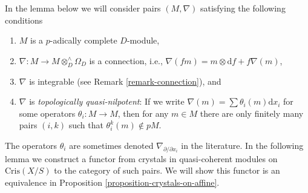 \noindent
In the lemma below we will consider pairs $(M, \nabla)$ satisfying the
following conditions
\begin{enumerate}
\item
\label{item-complete}
$M$ is a $p$-adically complete $D$-module,
\item
\label{item-connection}
$\nabla : M \to M \otimes^\wedge_D \Omega_D$ is a connection, i.e.,
$\nabla(fm) = m \otimes \text{d}f + f\nabla(m)$,
\item
\label{item-integrable}
$\nabla$ is integrable
(see Remark \ref{remark-connection}), and
\item
\label{item-topologically-quasi-nilpotent}
$\nabla$ is {\it topologically quasi-nilpotent}: If we write
$\nabla(m) = \sum \theta_i(m)\text{d}x_i$ for some operators
$\theta_i : M \to M$, then for any $m \in M$ there are only finitely
many pairs $(i, k)$ such that $\theta_i^k(m) \not \in pM$.
\end{enumerate}
The operators $\theta_i$ are sometimes denoted
$\nabla_{\partial/\partial x_i}$ in the literature.
In the following lemma we construct a functor from crystals in quasi-coherent
modules on $\text{Cris}(X/S)$ to the category of such pairs. We will show
this functor is an equivalence in
Proposition \ref{proposition-crystals-on-affine}.

